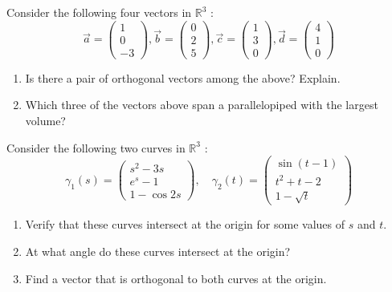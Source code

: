 \documentclass[12pt]{amsart}
\begin{document}
\begin{problem}
Consider the following four vectors in $\mathbb{R}^3$ :
$$
\vec{a}=\left(\begin{array}{c}
1 \\
0 \\
-3
\end{array}\right), 
\vec{b}=\left(\begin{array}{l}
0 \\
2 \\
5
\end{array}\right), 
\vec{c}=\left(\begin{array}{l}
1 \\
3 \\
0
\end{array}\right), 
\vec{d}=\left(\begin{array}{l}
4 \\
1 \\
0
\end{array}\right)
$$
\begin{enumerate}
    \item Is there a pair of orthogonal vectors among the above? Explain.
    \item Which three of the vectors above span a parallelopiped with the largest volume?
\end{enumerate}
\end{problem}


\begin{problem}
Consider the following two curves in $\mathbb{R}^3$ :
$$
\gamma_1(s)=\left(\begin{array}{c}
s^2-3 s \\
e^s-1 \\
1-\cos 2 s
\end{array}\right), 
\quad \gamma_2(t)=\left(\begin{array}{c}
\sin (t-1) \\
t^2+t-2 \\
1-\sqrt{t}
\end{array}\right)
$$
\begin{enumerate}
    \item  Verify that these curves intersect at the origin for some values of $s$ and $t$.
    \item  At what angle do these curves intersect at the origin?
    \item  Find a vector that is orthogonal to both curves at the origin.
\end{enumerate}
\end{problem}
\end{document}
